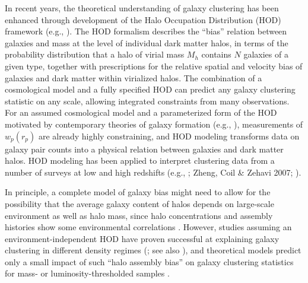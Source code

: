 \documentclass[]{emulateapj}
\newcommand{\wrp}{{w_p(r_p)}}
\begin{document}
In recent years, the theoretical understanding of galaxy clustering has been 
enhanced through development of the 
Halo Occupation Distribution (HOD) framework (e.g., 
\citealt{jing98a,ma00,peacock00,seljak00,scoccimarro01,berlind02,cooray02,
yang03,kravtsov04,zheng05}).
The HOD formalism describes the ``bias'' relation between galaxies
and mass at the level of individual dark matter halos, in terms of the 
probability distribution that a halo of virial mass $M_h$ contains $N$ galaxies 
of a given type, together with prescriptions for the relative spatial and 
velocity bias of galaxies and dark matter within virialized halos.  
The combination of a cosmological model and a fully specified HOD can
predict any galaxy clustering statistic on any scale, allowing integrated 
constraints from many observations. For an assumed cosmological model and a
parameterized form of the HOD motivated by contemporary theories of galaxy 
formation (e.g., 
\citealt{kauffmann97,kauffmann99,benson00,berlind03,kravtsov04,zheng05,conroy06}), measurements of $\wrp$ are already highly constraining, and
HOD modeling transforms data on galaxy pair counts into a physical 
relation between galaxies and dark matter halos. HOD modeling has been applied
to interpret clustering data from a number of surveys at low and high 
redshifts (e.g., \citealt{jing98b,jing02,bullock02,moustakas02,bosch03a,
magliocchetti03,yan03,zheng04,yang05b,zehavi05b,cooray05b,hamana05,
lee05,lee08}; Zheng, Coil \& Zehavi 2007;
\citealt{white07,blake08,brown08,quadri08,wake08,kim09,zheng09,ross10}). 

In principle, a complete model of galaxy bias might need to allow for the
possibility that the average galaxy content of halos depends on
large-scale environment as well as halo mass, since halo concentrations 
and assembly histories show some environmental correlations 
\citep{sheth04,gao05,harker06,wechsler06,zhu06,croton07,jing07,wetzel07,dalal08,zu08}.
However, studies assuming an environment-independent HOD have proven
successful at explaining galaxy clustering in different density regimes
(\citealt{abbas06,abbas07,tinker08,skibba09}; see also \citealt{blanton06,blanton07}),
and theoretical models predict only a small impact of such
``halo assembly bias'' on galaxy clustering statistics for mass-
or luminosity-thresholded samples \citep{yoo06,croton07,zu08}.
\end{document}
